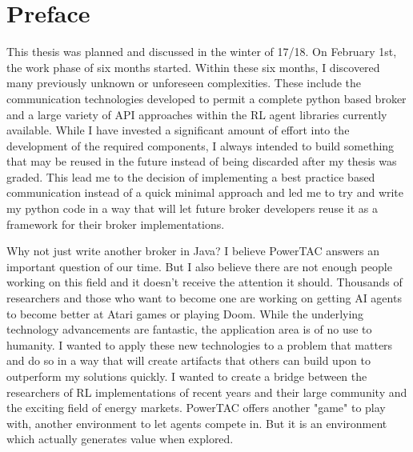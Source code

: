 \section*{Preface}

This thesis was planned and discussed in the winter of 17/18. On February 1st, the work phase of six months started.
Within these six months, I discovered many previously unknown or unforeseen complexities. These include the
communication technologies developed to permit a complete python based broker and a large variety of API approaches
within the RL agent libraries currently available. While I have invested a significant amount of effort into the
development of the required components, I always intended to build something that may be reused in the future instead of
being discarded after my thesis was graded. This lead me to the decision of implementing a best practice based
communication instead of a quick minimal approach and led me to try and write my python code in a way that will let
future broker developers reuse it as a framework for their broker implementations. 

Why not just write another broker in Java? I believe PowerTAC answers an important question of our time. But I also
believe there are not enough people working on this field and it doesn't receive the attention it should. Thousands of
researchers and those who want to become one are working on getting AI agents to become better at Atari games or playing
Doom. While the underlying technology advancements are fantastic, the application area is of no use to humanity. I
wanted to apply these new technologies to a problem that matters and do so in a way that will create artifacts that
others can build upon to outperform my solutions quickly. I wanted to create a bridge between the researchers of RL
implementations of recent years and their large community and the exciting field of energy markets. PowerTAC offers
another "game" to play with, another environment to let agents compete in. But it is an environment which actually
generates value when explored.

